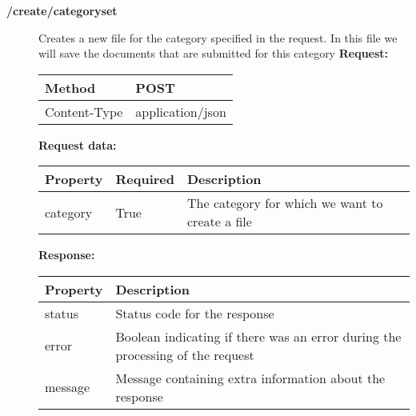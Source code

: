 \begin{description}
\item[\textbf{/create/categoryset}]
Creates a new file for the category specified in the request. In this file we will save the documents that are submitted for this category 
\newline
\newline
\textbf{Request:}
\newline
\newline
\begin{tabular}{ | l | l |}
\hline
Method & POST\\ \hline
Content-Type & application/json\\ \hline
\end{tabular}
\newline
\newline
\textbf{Request data:}
\newline
\newline
\begin{tabular}{ | l | l | l |}
\hline
\textbf{Property} & \textbf{Required} & \textbf{Description}\\ \hline
category & True & The category for which we want to create a file\\ \hline
\end{tabular}
\newline
\newline
\textbf{Response:}
\newline
\newline
\resizebox{\textwidth}{!} {
\begin{tabular}{ | l | l |}
\hline
\textbf{Property} & \textbf{Description}\\ \hline
status & Status code for the response\\ \hline
error & Boolean indicating if there was an error during the processing of the request\\ \hline
message & Message containing extra information about the response\\ \hline
\end{tabular}}



\end{description}
